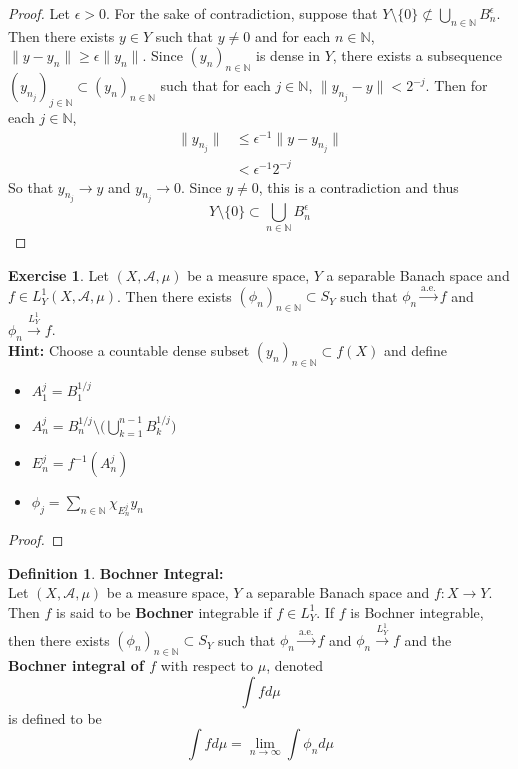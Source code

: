 \documentclass[12pt]{amsart}
\theoremstyle{definition}
\newtheorem{defn}[definition]{Definition}
\newtheorem{ex}[definition]{Exercise}
\newcommand{\ep}{\epsilon}
\newcommand{\N}{\mathbb{N}}
\newcommand{\MA}{\mathcal{A}}
\newcommand{\limn}{\lim \limits_{n \rightarrow \infty}}
\newcommand{\convt}[1]{\xrightarrow{\text{#1}}}
\newcommand{\conv}[1]{\xrightarrow{#1}}
\newcommand{\lex}[1]{\label{ex:#1}}
\newcommand{\ld}[1]{\label{defn:#1}}
\begin{document}
	\begin{proof}
	Let $\ep >0$. For the sake of contradiction, suppose that $Y\setminus \{ 0 \} \not \subset \bigcup\limits_{n \in \N}B^{\ep}_n$. Then there exists $y \in Y$ such that $y \neq 0$ and for each $n \in \N$, $\|y- y_n\| \geq \ep \|y_n\|$. Since $(y_n)_{n \in \N}$ is dense in $Y$, there exists a subsequence $(y_{n_j})_{j \in \N} \subset (y_n)_{n \in \N}$ such that for each $j \in \N$, $\|y_{n_j} - y\| < 2^{-j}$. Then for each $j \in \N$,
	\begin{align*}
	\|y_{n_j}\| 
	& \leq  \ep^{-1}\|y- y_{n_j}\| \\
	& < \ep^{-1}2^{-j}
	\end{align*}
	So that $y_{n_j} \rightarrow y$ and $y_{n_j} \rightarrow 0$. Since $y \neq 0$, this is a contradiction and thus $$Y \setminus \{ 0 \} \subset \bigcup\limits_{n \in \N}B^{\ep}_n$$
	\end{proof}
	
	\begin{ex} \lex{00000} 
	Let $(X, \MA, \mu)$ be a measure space, $Y$ a separable Banach space and $f \in L^1_Y(X, \MA, \mu)$. Then there exists $(\phi_n)_{n \in \N} \subset S_Y$ such that $\phi_n \convt{a.e.} f$ and $\phi_n \conv{L_Y^1} f$.\\
	\textbf{Hint:} Choose a countable dense subset $(y_n)_{n \in \N} \subset f(X)$ and define 
	\begin{itemize}
	\item $A_1^j = B^{1/j}_1$ 
	\item $A_n^j = B^{1/j}_n  \setminus \bigg( \bigcup \limits_{k=1}^{n-1} B^{1/j}_k \bigg)$ 
	\item $E_n^j = f^{-1}(A^j_n)$ 
	\item $\phi_j = \sum\limits_{n \in \N}\chi_{E_n^j}y_n$
	\end{itemize}
	\end{ex}
	
	\begin{proof}
	
\end{proof}		
	
	\begin{defn} \ld{00000} \textbf{Bochner Integral:}\\
	Let $(X, \MA, \mu)$ be a measure space, $Y$ a separable Banach space and $f:X \rightarrow Y$. Then $f$ is said to be \textbf{Bochner} integrable if $f \in L^1_Y$. If $f$ is Bochner integrable, then there exists $(\phi_n)_{n \in \N} \subset S_Y$ such that $\phi_n \convt{a.e.} f$ and $\phi_n \conv{L_Y^1} f$ and the \textbf{Bochner integral of $f$} with respect to $\mu$, denoted $$\int f d\mu$$ is defined to be $$\int f d\mu = \limn \int \phi_n d\mu$$ 
	\end{defn}
	
\end{document}

